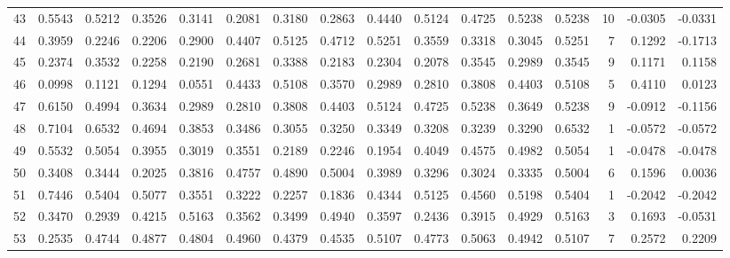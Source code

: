 \begin{tabular}{lrrrrrrrrrrrrrrr}
43  &      0.5543 &  0.5212 &  0.3526 &  0.3141 &  0.2081 &  0.3180 &  0.2863 &  0.4440 &  0.5124 &  0.4725 &   0.5238 &     0.5238 &     10 &                   -0.0305 &                    -0.0331 \\
44  &      0.3959 &  0.2246 &  0.2206 &  0.2900 &  0.4407 &  0.5125 &  0.4712 &  0.5251 &  0.3559 &  0.3318 &   0.3045 &     0.5251 &      7 &                    0.1292 &                    -0.1713 \\
45  &      0.2374 &  0.3532 &  0.2258 &  0.2190 &  0.2681 &  0.3388 &  0.2183 &  0.2304 &  0.2078 &  0.3545 &   0.2989 &     0.3545 &      9 &                    0.1171 &                     0.1158 \\
46  &      0.0998 &  0.1121 &  0.1294 &  0.0551 &  0.4433 &  0.5108 &  0.3570 &  0.2989 &  0.2810 &  0.3808 &   0.4403 &     0.5108 &      5 &                    0.4110 &                     0.0123 \\
47  &      0.6150 &  0.4994 &  0.3634 &  0.2989 &  0.2810 &  0.3808 &  0.4403 &  0.5124 &  0.4725 &  0.5238 &   0.3649 &     0.5238 &      9 &                   -0.0912 &                    -0.1156 \\
48  &      0.7104 &  0.6532 &  0.4694 &  0.3853 &  0.3486 &  0.3055 &  0.3250 &  0.3349 &  0.3208 &  0.3239 &   0.3290 &     0.6532 &      1 &                   -0.0572 &                    -0.0572 \\
49  &      0.5532 &  0.5054 &  0.3955 &  0.3019 &  0.3551 &  0.2189 &  0.2246 &  0.1954 &  0.4049 &  0.4575 &   0.4982 &     0.5054 &      1 &                   -0.0478 &                    -0.0478 \\
50  &      0.3408 &  0.3444 &  0.2025 &  0.3816 &  0.4757 &  0.4890 &  0.5004 &  0.3989 &  0.3296 &  0.3024 &   0.3335 &     0.5004 &      6 &                    0.1596 &                     0.0036 \\
51  &      0.7446 &  0.5404 &  0.5077 &  0.3551 &  0.3222 &  0.2257 &  0.1836 &  0.4344 &  0.5125 &  0.4560 &   0.5198 &     0.5404 &      1 &                   -0.2042 &                    -0.2042 \\
52  &      0.3470 &  0.2939 &  0.4215 &  0.5163 &  0.3562 &  0.3499 &  0.4940 &  0.3597 &  0.2436 &  0.3915 &   0.4929 &     0.5163 &      3 &                    0.1693 &                    -0.0531 \\
53  &      0.2535 &  0.4744 &  0.4877 &  0.4804 &  0.4960 &  0.4379 &  0.4535 &  0.5107 &  0.4773 &  0.5063 &   0.4942 &     0.5107 &      7 &                    0.2572 &                     0.2209 \\

\end{tabular}
